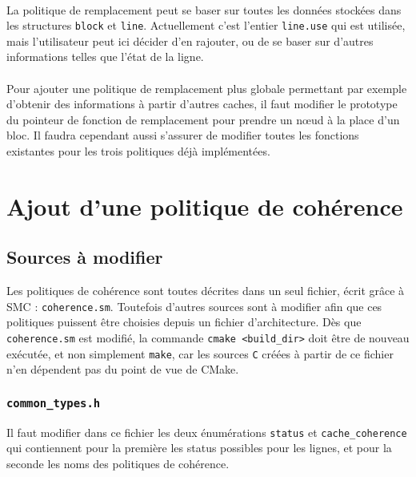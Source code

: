\paragraph{}
La politique de remplacement peut se baser sur toutes les données stockées dans les structures \texttt{block} et \texttt{line}. Actuellement c'est l'entier \texttt{line.use} qui est utilisée, mais l'utilisateur peut ici décider d'en rajouter, ou de se baser sur d'autres informations telles que l'état de la ligne.

\paragraph{}
Pour ajouter une politique de remplacement plus globale permettant par exemple d'obtenir des informations à partir d'autres caches, il faut modifier le prototype du pointeur de fonction de remplacement pour prendre un n{\oe}ud à la place d'un bloc. Il faudra cependant aussi s'assurer de modifier toutes les fonctions existantes pour les trois politiques déjà implémentées.

\section{Ajout d'une politique de cohérence}
\label{tuto_aut}

\subsection{Sources à modifier}

Les politiques de cohérence sont toutes décrites dans un seul fichier, écrit grâce à \textsf{SMC} : \texttt{coherence.sm}. Toutefois d'autres sources sont à modifier afin que ces politiques puissent être choisies depuis un fichier d'architecture. Dès que \texttt{coherence.sm} est modifié, la commande \verb!cmake <build_dir>! doit être de nouveau exécutée, et non simplement \verb!make!, car les sources \texttt{C} créées à partir de ce fichier n'en dépendent pas du point de vue de \textsf{CMake}.

\subsubsection{\texttt{common\_types.h}}

Il faut modifier dans ce fichier les deux énumérations \texttt{status} et \texttt{cache\_coherence} qui contiennent pour la première les status possibles pour les lignes, et pour la seconde les noms des politiques de cohérence.

